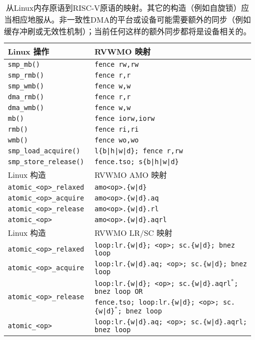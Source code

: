 \begin{table}[h!]
  \centering
  \begin{tabular}{|l|l|}
    \hline
    Linux 操作           & RVWMO 映射 \\
    \hline
    \hline
    \tt smp\_mb()             & \tt fence rw,rw \\
    \hline
    \tt smp\_rmb()            & \tt fence r,r \\
    \hline
    \tt smp\_wmb()            & \tt fence w,w \\
    \hline
    \tt dma\_rmb()            & \tt fence r,r \\
    \hline
    \tt dma\_wmb()            & \tt fence w,w \\
    \hline
    \tt mb()                  & \tt fence iorw,iorw \\
    \hline
    \tt rmb()                 & \tt fence ri,ri \\
    \hline
    \tt wmb()                 & \tt fence wo,wo \\
    \hline
    \tt smp\_load\_acquire()   & \tt l\{b|h|w|d\}; fence r,rw \\
    \hline
    \tt smp\_store\_release()  & \tt fence.tso; s\{b|h|w|d\}  \\
    \hline
    \hline
    Linux 构造            & RVWMO AMO 映射        \\
    \hline
    \tt atomic\_<op>\_relaxed  & \tt amo<op>.\{w|d\}      \\
    \hline
    \tt atomic\_<op>\_acquire  & \tt amo<op>.\{w|d\}.aq   \\
    \hline
    \tt atomic\_<op>\_release  & \tt amo<op>.\{w|d\}.rl   \\
    \hline
    \tt atomic\_<op>           & \tt amo<op>.\{w|d\}.aqrl \\
    \hline
    \hline
    Linux 构造            & RVWMO LR/SC 映射\\
    \hline
    \tt atomic\_<op>\_relaxed  & \tt loop:\@ lr.\{w|d\}; <op>; sc.\{w|d\}; bnez loop \\
    \hline
    \tt atomic\_<op>\_acquire  & \tt loop:\@ lr.\{w|d\}.aq; <op>; sc.\{w|d\}; bnez loop \\
    \hline
    \multirow{2}{*}{\tt atomic\_<op>\_release}
      & \tt loop:\@ lr.\{w|d\}; <op>; sc.\{w|d\}.aqrl$^*$; bnez loop \textrm{OR} \\
      & \tt fence.tso; loop:\@ lr.\{w|d\}; <op>; sc.\{w|d\}$^*$; bnez loop \\
    \hline
    \tt atomic\_<op>           & \tt loop:\@ lr.\{w|d\}.aq; <op>; sc.\{w|d\}.aqrl; bnez loop \\
    \hline
  \end{tabular}
  \caption{从Linux内存原语到RISC-V原语的映射。其它的构造（例如自旋锁）应当相应地服从。非一致性DMA的平台或设备可能需要额外的同步（例如缓存冲刷或无效性机制）；当前任何这样的额外同步都将是设备相关的。
    }
  \label{tab:linuxmappings}
\end{table}

